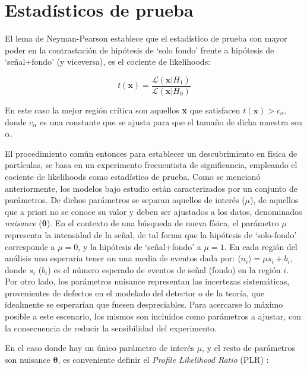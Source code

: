 \section{Estadísticos de prueba}


El lema de Neyman-Pearson \cite{10.2307/91247} establece que el estadístico de prueba con mayor poder en la contrastación de hipótesis de `solo fondo' frente a hipótesis de `señal+fondo' (y viceversa), es el cociente de likelihoods:


\begin{equation}
	t(\textbf{x}) = \frac{\mathcal{L}(\textbf{x}|H_1)}{\mathcal{L}(\textbf{x}|H_0)}
\end{equation}

En este caso la mejor región crítica son aquellos \textbf{x} que satisfacen $t(\textbf{x})>c_\alpha$, donde $c_\alpha$ es una constante que se ajusta para que el tamaño de dicha muestra sea $\alpha$.

El procedimiento común entonces para establecer un descubrimiento en física de partículas, se basa en un experimento frecuentista de significancia, empleando el cociente de likelihoods como estadístico de prueba. Como se mencionó anteriormente, los modelos bajo estudio están caracterizados por un conjunto de parámetros. De dichos parámetros se separan aquellos de interés ($\mu$), de aquellos que a priori no se conoce su valor y deben ser ajustados a los datos, denominados \textit{nuisance} ($\bm{\theta}$). En el contexto de una búsqueda de nueva física, el parámetro $\mu$ representa la intensidad de la señal, de tal forma que la hipótesis de `solo-fondo' corresponde a $\mu = 0$, y la hipótesis de `señal+fondo' a $\mu = 1$. En cada región del análisis uno esperaría tener un una media de eventos dada por: $\langle n_i \rangle = \mu s_i + b_i$, donde $s_i$ ($b_i$) es el número esperado de eventos de señal (fondo) en la región $i$. Por otro lado, los parámetros nuisance representan las incertezas sistemáticas, provenientes de defectos en el modelado del detector o de la teoría, que idealmente se esperarían que fuesen despreciables. Para acercarse lo máximo posible a este escenario, los mismos son incluidos como parámetros a ajustar, con la consecuencia de reducir la sensibilidad del experimento.

En el caso donde hay un único parámetro de interés $\mu$, y el resto de parámetros son nuisance $\bm{\theta}$, es conveniente definir el \textit{Profile Likelihood Ratio} (PLR) \cite{Cowan:2010js}:

